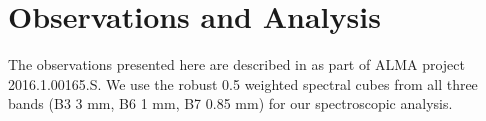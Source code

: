 \documentclass[twocolumn]{aastex62}
\begin{document}
\section{Observations and Analysis}



The observations presented here are described in \citet{Ginsburg2018b} as part
of ALMA project 2016.1.00165.S.  We use the robust 0.5 weighted spectral cubes
from all three bands (B3 3 mm, B6 1 mm, B7 0.85 mm) for our spectroscopic analysis.
\end{document}
